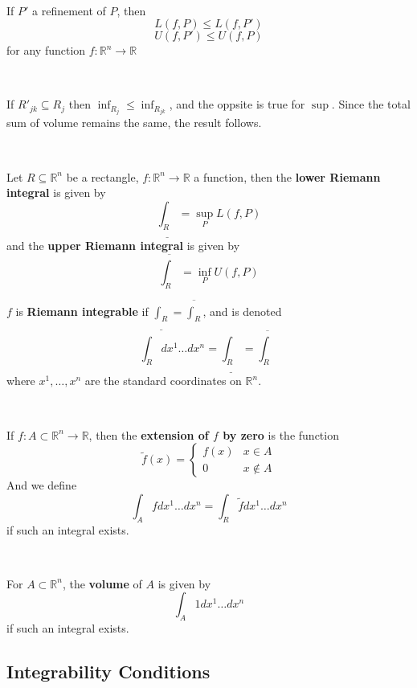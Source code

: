 \documentclass{article}
\begin{document}
\begin{proposition}
  \

  If $P'$ a refinement of $P$, then $$L(f, P) \leq L(f, P')$$$$U(f, P') \leq U(f,P)$$for any function $f: \mathbb{R}^n \to \mathbb{R}$
\end{proposition}

\begin{customproof}
  \

  If $R'_{jk} \subseteq R_j$ then $\inf_{R_j} \leq \inf_{R_{jk}}$, and the oppsite is true for $\sup$. Since the total sum of volume remains the same, the result follows.
\end{customproof}

\begin{definition}
  \

  Let $R \subseteq \mathbb{R}^n$ be a rectangle, $f: \mathbb{R}^n \to \mathbb{R}$ a function, then the \textbf{lower Riemann integral} is given by $$\underline{\int_R} = \sup_P L(f,P)$$and the \textbf{upper Riemann integral} is given by $$\overline{\int_R} = \inf_P U(f,P)$$

  $f$ is \textbf{Riemann integrable} if $\underline{\int_R} = \overline{\int_R}$, and is denoted $$\int_R dx^1\dots dx^n = \underline{\int_R} = \overline{\int_R}$$where $x^1, \dots, x^n$ are the standard coordinates on $\mathbb{R}^n$.
\end{definition}

\begin{definition}
  \

  If $f: A \subset \mathbb{R}^n \to \mathbb{R}$, then the \textbf{extension of $f$ by zero} is the function $$\tilde{f}(x) =
  \begin{cases}
    f(x) & x \in A\\
    0 & x \notin A
  \end{cases}$$And we define $$\int_A f dx^1\dots dx^n = \int_R \tilde{f} dx^1 \dots dx^n$$if such an integral exists.
\end{definition}

\begin{definition}[Volume]
  \

  For $A \subset \mathbb{R}^n$, the \textbf{volume} of $A$ is given by $$\int_A 1 dx^1 \dots dx^n $$if such an integral exists.
\end{definition}

\subsection{Integrability Conditions}
\
\end{document}
